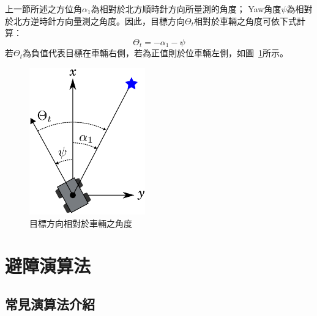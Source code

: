 上一節所述之方位角$\alpha_1$為相對於北方順時針方向所量測的角度；
Yaw角度$\psi$為相對於北方逆時針方向量測之角度。因此，目標方向$\Theta_t$相對於車輛之角度可依下式計算：
\begin{equation}
	\Theta_t = -\alpha_1 - \psi
\end{equation}
若$\Theta_t$為負值代表目標在車輛右側，若為正值則於位車輛左側，如圖~\ref{f:target_angle}所示。
\begin{figure}[h!]
	\centering
	\includegraphics[width=5cm]{figures/TargetAngle}
	\caption{目標方向相對於車輛之角度}
	\label{f:target_angle}
\end{figure}

\section{避障演算法}
\label{sec:vfhplus}

\subsection{常見演算法介紹}

